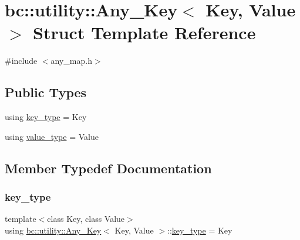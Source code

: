 \hypertarget{structbc_1_1utility_1_1Any__Key}{}\section{bc\+:\+:utility\+:\+:Any\+\_\+\+Key$<$ Key, Value $>$ Struct Template Reference}
\label{structbc_1_1utility_1_1Any__Key}


{\ttfamily \#include $<$any\+\_\+map.\+h$>$}

\subsection*{Public Types}
\begin{DoxyCompactItemize}
\item 
using \hyperlink{structbc_1_1utility_1_1Any__Key_ae03da9e72e3dae70a87df8dfff64ed5c}{key\+\_\+type} = Key
\item 
using \hyperlink{structbc_1_1utility_1_1Any__Key_ae37f44db013d6698a17f5c095f32e36b}{value\+\_\+type} = Value
\end{DoxyCompactItemize}


\subsection{Member Typedef Documentation}
\mbox{\label{structbc_1_1utility_1_1Any__Key_ae03da9e72e3dae70a87df8dfff64ed5c}} 
\subsubsection{\texorpdfstring{key\+\_\+type}{key\_type}}
{\footnotesize\ttfamily template$<$class Key, class Value$>$ \\
using \hyperlink{structbc_1_1utility_1_1Any__Key}{bc\+::utility\+::\+Any\+\_\+\+Key}$<$ Key, Value $>$\+::\hyperlink{structbc_1_1utility_1_1Any__Key_ae03da9e72e3dae70a87df8dfff64ed5c}{key\+\_\+type} =  Key}

\mbox{\label{structbc_1_1utility_1_1Any__Key_ae37f44db013d6698a17f5c095f32e36b}} 
